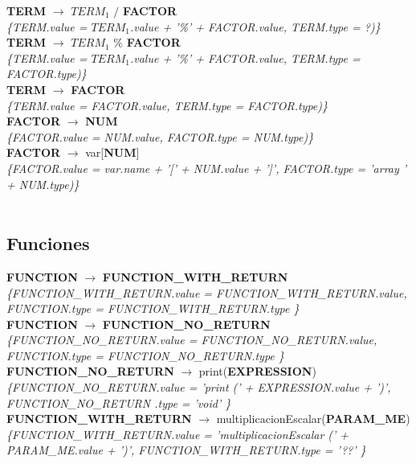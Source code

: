 \documentclass[10pt,a4paper]{article}
\begin{document}
\textbf{TERM} $\rightarrow$ \textbf{$TERM_{1}$} $/$ \textbf{FACTOR}   \\
\textit{\{TERM.value = $TERM_{1}$.value + '\%' + FACTOR.value, TERM.type = ?)\}} \\

\textbf{TERM} $\rightarrow$ \textbf{$TERM_{1}$} \% \textbf{FACTOR}  \\
\textit{\{TERM.value = $TERM_{1}$.value + '\%' + FACTOR.value, TERM.type = FACTOR.type)\}} \\

\textbf{TERM} $\rightarrow$ \textbf{FACTOR} \\
\textit{\{TERM.value = FACTOR.value, TERM.type = FACTOR.type)\}} \\

\textbf{FACTOR} $\rightarrow$ \textbf{NUM}   \\
\textit{\{FACTOR.value = NUM.value, FACTOR.type = NUM.type)\}} \\

\textbf{FACTOR} $\rightarrow$ var[\textbf{NUM}]  \\ 
\textit{\{FACTOR.value = var.name + '[' + NUM.value + ']', FACTOR.type = 'array ' + NUM.type)\}}  \\ 
\\

\subsection{Funciones}
\textbf{FUNCTION} $\rightarrow$ \textbf{FUNCTION\_WITH\_RETURN} \\
\textit{\{FUNCTION\_WITH\_RETURN.value =  FUNCTION\_WITH\_RETURN.value, FUNCTION.type = FUNCTION\_WITH\_RETURN.type \}} \\

\textbf{FUNCTION} $\rightarrow$ \textbf{FUNCTION\_NO\_RETURN} \\
\textit{\{FUNCTION\_NO\_RETURN.value =  FUNCTION\_NO\_RETURN.value, FUNCTION.type = FUNCTION\_NO\_RETURN.type \}} \\

\textbf{FUNCTION\_NO\_RETURN} $\rightarrow$ print(\textbf{EXPRESSION}) \\   
\textit{\{FUNCTION\_NO\_RETURN.value =  'print (' + EXPRESSION.value + ')', FUNCTION\_NO\_RETURN .type = 'void' \}} \\

\textbf{FUNCTION\_WITH\_RETURN} $\rightarrow$ multiplicacionEscalar(\textbf{PARAM\_ME}) \\ 
\textit{\{FUNCTION\_WITH\_RETURN.value =  'multiplicacionEscalar (' + PARAM\_ME.value + ')', FUNCTION\_WITH\_RETURN.type = '??' \}} \\
\end{document}
